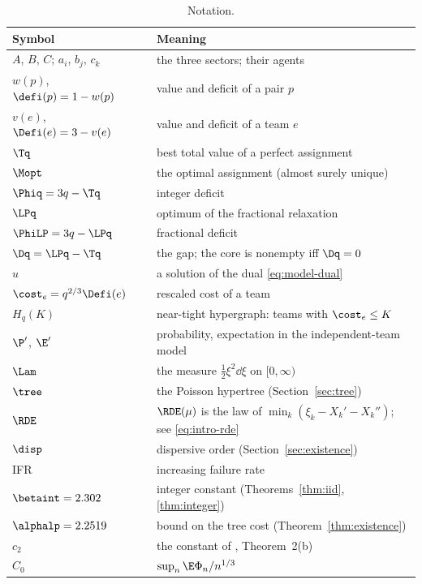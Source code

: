 \begin{table}[ht]
\caption{Notation.}\label{tab:model-notation}
\small
\begin{tabular}{@{}ll@{}}
\toprule
Symbol & Meaning \\
\midrule
$A$, $B$, $C$; $a_i$, $b_j$, $c_k$ & the three sectors; their agents \\
$w(p)$, $\defi(p)=1-w(p)$ & value and deficit of a pair $p$ \\
$v(e)$, $\Defi(e)=3-v(e)$ & value and deficit of a team $e$ \\
$\Tq$ & best total value of a perfect assignment \\
$\Mopt$ & the optimal assignment (almost surely unique) \\
$\Phiq=3q-\Tq$ & integer deficit \\
$\LPq$ & optimum of the fractional relaxation \\
$\PhiLP=3q-\LPq$ & fractional deficit \\
$\Dq=\LPq-\Tq$ & the gap; the core is nonempty iff $\Dq=0$ \\
$u$ & a solution of the dual \eqref{eq:model-dual} \\
$\cost_e=q^{2/3}\Defi(e)$ & rescaled cost of a team \\
$H_q(K)$ & near-tight hypergraph: teams with $\cost_e\le K$ \\
$\P'$, $\E'$ & probability, expectation in the independent-team model \\
$\Lam$ & the measure $\tfrac12\xi^2\dd\xi$ on $[0,\infty)$ \\
$\tree$ & the Poisson hypertree (Section~\ref{sec:tree}) \\
$\RDE$ & $\RDE(\mu)$ is the law of $\min_k(\xi_k-X_k'-X_k'')$; see \eqref{eq:intro-rde} \\
$\disp$ & dispersive order (Section~\ref{sec:existence}) \\
IFR & increasing failure rate \\
$\betaint=2.302$ & integer constant (Theorems~\ref{thm:iid}, \ref{thm:integer}) \\
$\alphalp=2.2519$ & bound on the tree cost (Theorem~\ref{thm:existence}) \\
$c_2$ & the constant of \cite{FPT20}, Theorem~2(b) \\
$C_0$ & $\sup_n\E\Phi_n/n^{1/3}$ \\
\bottomrule
\end{tabular}
\end{table}
